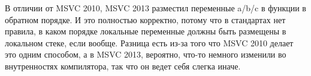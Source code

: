 В отличии от MSVC 2010, MSVC 2013 разместил переменные a/b/c в функции  в обратном порядке.
И это полностью корректно, потому что в стандартах \CCpp нет правила, в каком порядке локальные переменные должны быть размещены в локальном стеке, если вообще.
Разница есть из-за того что MSVC 2010 делает это одним способом, а в MSVC 2013, вероятно, что-то немного изменили во внутренностях компилятора, так что он ведет себя слегка иначе.

